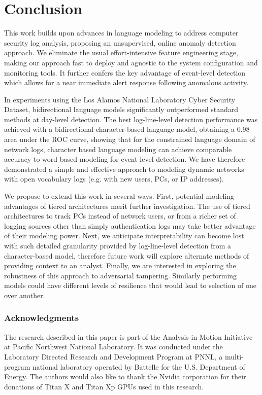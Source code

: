 \documentclass[letterpaper]{article} %
\begin{document}
\section{Conclusion}
This work builds upon advances in language modeling to address computer security log analysis, proposing an unsupervised, online anomaly detection approach. We eliminate the usual effort-intensive feature engineering stage, making our approach fast to deploy and agnostic to the system configuration and monitoring tools. It further confers the key advantage of event-level detection which allows for a near immediate alert response following anomalous activity. 

In experiments using the Los Alamos National Laboratory Cyber Security Dataset, bidirectional language models significantly outperformed standard methods at day-level detection. The best log-line-level detection performance was achieved with a bidirectional character-based language model, obtaining a 0.98 area under the ROC curve, 
showing  that for the constrained language domain of network logs, character based language modeling can achieve comparable accuracy to word based modeling for event level detection. We have therefore demonstrated a simple and effective approach to modeling dynamic networks with open vocabulary logs (e.g. with new users, PCs, or IP addresses).  

We propose to extend this work in several ways. 
First, potential modeling advantages of tiered architectures merit further investigation. The use of tiered architectures to track PCs instead of network users, or from a richer set of logging sources other than simply authentication logs may take better advantage of their modeling power. 
Next, we anticipate interpretability can become lost with such detailed granularity provided by log-line-level detection from a character-based model, therefore future work will explore alternate methods of providing context to an analyst.  
Finally, we are interested in exploring the robustness of this approach to adversarial tampering. Similarly performing models could have different levels of resilience that would lead to selection of one over another.

\subsubsection*{Acknowledgments}
The research described in this paper is part of the Analysis in Motion Initiative at Pacific Northwest National Laboratory. It was conducted under the Laboratory Directed Research and Development Program at PNNL, a multi-program national laboratory operated by Battelle for the U.S. Department of Energy.  The authors would also like to thank the Nvidia corporation for their donations of Titan X and Titan Xp GPUs used in this research.  



\end{document}

